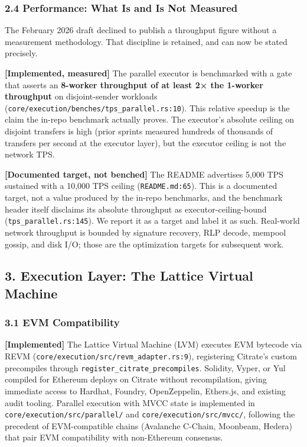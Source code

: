\subsubsection{2.4 Performance: What Is and Is Not
Measured}\label{performance-what-is-and-is-not-measured}

The February 2026 draft declined to publish a throughput figure without
a measurement methodology. That discipline is retained, and can now be
stated precisely.

\textbf{{[}Implemented, measured{]}} The parallel executor is
benchmarked with a gate that asserts an \textbf{8-worker throughput of
at least 2× the 1-worker throughput} on disjoint-sender workloads
(\texttt{core/execution/benches/tps\_parallel.rs:10}). This relative
speedup is the claim the in-repo benchmark actually proves. The
executor's absolute ceiling on disjoint transfers is high (prior sprints
measured hundreds of thousands of transfers per second at the executor
layer), but the executor ceiling is not the network TPS.

\textbf{{[}Documented target, not benched{]}} The README advertises
5,000 TPS sustained with a 10,000 TPS ceiling (\texttt{README.md:65}).
This is a documented target, not a value produced by the in-repo
benchmarks, and the benchmark header itself disclaims its absolute
throughput as executor-ceiling-bound (\texttt{tps\_parallel.rs:145}). We
report it as a target and label it as such. Real-world network
throughput is bounded by signature recovery, RLP decode, mempool gossip,
and disk I/O; those are the optimization targets for subsequent work.

\subsection{3. Execution Layer: The Lattice Virtual
Machine}\label{execution-layer-the-lattice-virtual-machine}

\subsubsection{3.1 EVM Compatibility}\label{evm-compatibility}

\textbf{{[}Implemented{]}} The Lattice Virtual Machine (LVM) executes
EVM bytecode via REVM (\texttt{core/execution/src/revm\_adapter.rs:9}),
registering Citrate's custom precompiles through
\texttt{register\_citrate\_precompiles}. Solidity, Vyper, or Yul
compiled for Ethereum deploys on Citrate without recompilation, giving
immediate access to Hardhat, Foundry, OpenZeppelin, Ethers.js, and
existing audit tooling. Parallel execution with MVCC state is
implemented in \texttt{core/execution/src/parallel/} and
\texttt{core/execution/src/mvcc/}, following the precedent of
EVM-compatible chains (Avalanche C-Chain, Moonbeam, Hedera) that pair
EVM compatibility with non-Ethereum consensus.

